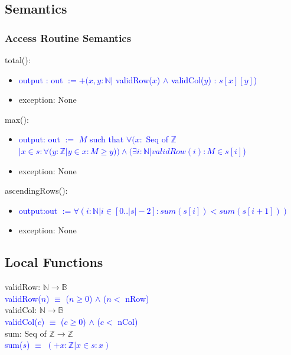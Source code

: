 \documentclass[12pt]{article}
\begin{document}
\subsection* {Semantics}

\subsubsection* {Access Routine Semantics}

\noindent total(): 
\begin{itemize}
\item \textcolor{blue}{output : out $:= +(x, y : \mathbb{N} |$ validRow($x$) $\land$ validCol($y$) : $s[x][y]$)}
\item exception: None
\end{itemize}

\noindent max():
\begin{itemize}
\item \textcolor{blue}{output: out $:=$ $M$ such that $\forall (x : $ Seq of $\mathbb{Z}$ $| x \in s : \forall (y : \mathbb{Z} | y \in x : M \geq y ))  \land (\exists i : \mathbb{N} | validRow(i) : M \in s[i] $)}
\item exception: None
\end{itemize}

\noindent ascendingRows():
\begin{itemize}
\item \textcolor{blue}{output:out $:= \forall (i : \mathbb{N} | i \in [0..|s|-2] : sum(s[i]) < sum(s[i+1])) $}
\item exception: None
\end{itemize}

\subsection*{Local Functions}

\noindent validRow: $\mathbb{N} \rightarrow \mathbb{B}$\\
\noindent \textcolor{blue}{validRow($n$) $\equiv$ ($n \geq 0$) $\land$ ($n < $ nRow)}\\

\noindent validCol: $\mathbb{N} \rightarrow \mathbb{B}$\\
\noindent \textcolor{blue}{validCol($c$) $\equiv$ ($c \geq 0$) $\land$ ($c < $ nCol)}\\
  
\noindent sum: Seq of $\mathbb{Z} \rightarrow \mathbb{Z}$\\
\noindent \textcolor{blue}{sum($s$) $\equiv$ $(+x : \mathbb{Z} | x \in s: x)$}

\newpage


  
\end{document}
